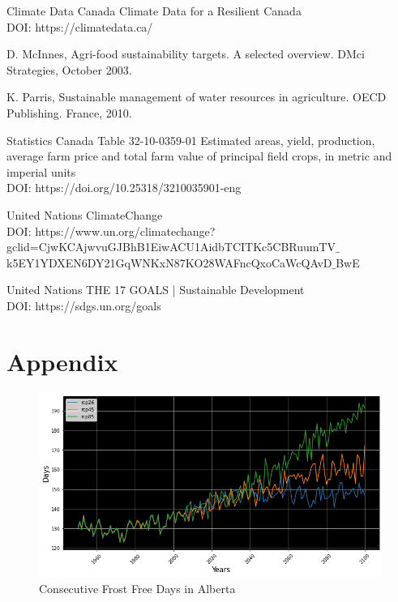\documentclass[11pt]{article}
\numberwithin{equation}{section}
\begin{document}
\begin{thebibliography}{99}

{\sc Climate Data Canada}
Climate Data for a Resilient Canada \\
{\sc DOI:} https://climatedata.ca/

{\sc D. McInnes},
Agri-food sustainability targets. A selected overview. DMci Strategies, October 2003.

{\sc K. Parris},
Sustainable management of water resources in agriculture. OECD Publishing. France, 2010.

{\sc Statistics Canada}
Table 32-10-0359-01  Estimated areas, yield, production, average farm price and total farm value of principal field crops, in metric and imperial units \\
{\sc DOI:}  https://doi.org/10.25318/3210035901-eng

{\sc United Nations}
ClimateChange \\
{\sc DOI:} https://www.un.org/climatechange?gclid=CjwKCAjwvuGJBhB1EiwACU1AidbTCITKc5CBRuumTV$\_$k5EY1YDXEN6DY21GqWNKxN87KO28WAFncQxoCaWcQAvD$\_$BwE

{\sc United Nations}
THE 17 GOALS | Sustainable Development \\
{\sc DOI:} https://sdgs.un.org/goals

\end{thebibliography}

\section*{Appendix}\label{figures}

\begin{figure}[h!]
\centering
\includegraphics[scale=0.4]{ABfrost}
\caption{Consecutive Frost Free Days in Alberta}
\label{ABfrostdays}
\end{figure}
\end{document}
